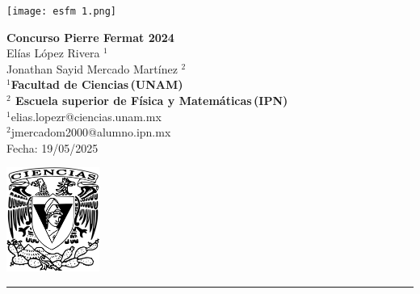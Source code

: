 \documentclass[11pt,letterpaper]{article}
\begin{document}

\begin{center}
    \begin{minipage}{3cm}
    	\begin{center}
    		\texttt{[image: esfm 1.png]}
    	\end{center}
    \end{minipage}\hfill
    \begin{minipage}{10cm}
    	\begin{center}
    	
        \textbf{Concurso Pierre Fermat 2024}\\[0.1cm]
      El\'ias L\'opez Rivera  $^{1}$ \\[0.1cm]
       Jonathan Sayid Mercado Mart\'inez   $^{2}$\\[0.1cm] 
        \textbf{$^{1}$Facultad de Ciencias\,(UNAM)}\\[0.1cm]
        \textbf{$^{2}$ Escuela superior de F\'isica y Matem\'aticas\,(IPN)}\\[0.1cm]
        $^{1}$elias.lopezr@ciencias.unam.mx\\[0.1cm]
        $^{2}$jmercadom2000@alumno.ipn.mx \\[0.1cm]
        Fecha:\,\,19/05/2025
    	\end{center}
    \end{minipage}\hfill
    \begin{minipage}{3cm}
    	\begin{center}
    		\includegraphics[height=3.4cm]{Logo_FC.png}
    	\end{center}
    \end{minipage}
\end{center}

\rule{17cm}{0.1mm}
\end{document}
